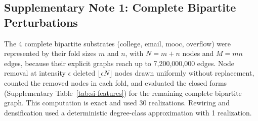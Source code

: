 \documentclass{article}
\begin{document}
\clearpage
\subsection*{Supplementary Note 1: Complete Bipartite Perturbations}
\label{sec:si-note-bipartite}
The 4 complete bipartite substrates (college, email, mooc, overflow) were represented by their fold sizes $m$ and $n$, with $N = m + n$ nodes and $M = mn$ edges, because their explicit graphs reach up to 7,200,000,000 edges. Node removal at intensity $\epsilon$ deleted $\lfloor \epsilon N \rfloor$ nodes drawn uniformly without replacement, counted the removed nodes in each fold, and evaluated the closed forms (Supplementary Table~\ref{tab:si-features}) for the remaining complete bipartite graph. This computation is exact and used 30 realizations. Rewiring and densification used a deterministic degree-class approximation with 1 realization.
\end{document}
